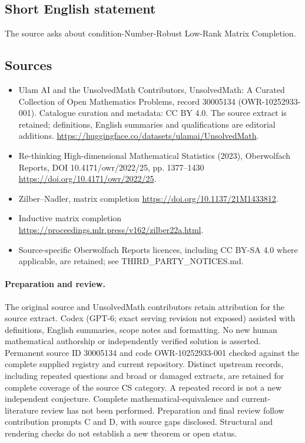\documentclass[11pt]{article}
\begin{document}
\subsection{Short English statement}
The source asks about condition-Number-Robust Low-Rank Matrix Completion.
\subsection{Sources}
\begin{itemize}
\item[\hypertarget{source:30005134:1}{S1}] Ulam AI and the UnsolvedMath Contributors, UnsolvedMath: A Curated Collection of Open Mathematics Problems, record 30005134 (OWR-10252933-001). Catalogue curation and metadata: CC BY 4.0. The source extract is retained; definitions, English summaries and qualifications are editorial additions.
\url{https://huggingface.co/datasets/ulamai/UnsolvedMath}.
\item[\hypertarget{source:30005134:2}{S2}] Re-thinking High-dimensional Mathematical Statistics (2023), Oberwolfach Reports, DOI 10.4171/owr/2022/25, pp. 1377--1430
\url{https://doi.org/10.4171/owr/2022/25}.
\item[\hypertarget{source:30005134:3}{S3}] Zilber--Nadler, matrix completion
\url{https://doi.org/10.1137/21M1433812}.
\item[\hypertarget{source:30005134:4}{S4}] Inductive matrix completion
\url{https://proceedings.mlr.press/v162/zilber22a.html}.
\item Source-specific Oberwolfach Reports licences, including CC BY-SA 4.0 where applicable, are retained; see THIRD\_PARTY\_NOTICES.md.
\end{itemize}
\paragraph{Preparation and review.}
The original source and UnsolvedMath contributors retain attribution for the source extract. Codex (GPT-6; exact serving revision not exposed) assisted with definitions, English summaries, scope notes and formatting. No new human mathematical authorship or independently verified solution is asserted. Permanent source ID 30005134 and code OWR-10252933-001 checked against the complete supplied registry and current repository. Distinct upstream records, including repeated questions and broad or damaged extracts, are retained for complete coverage of the source CS category. A repeated record is not a new independent conjecture. Complete mathematical-equivalence and current-literature review has not been performed. Preparation and final review follow contribution prompts C and D, with source gaps disclosed. Structural and rendering checks do not establish a new theorem or open status.
\label{end:30005134}
\end{document}
